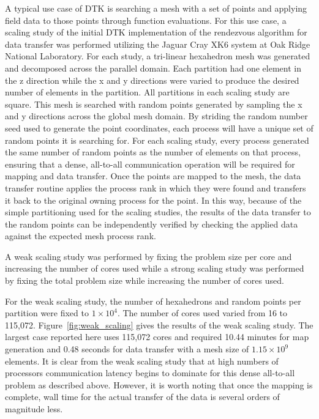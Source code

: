 \documentclass{mc2013}
\begin{document}
\label{sec:examples}

\label{subsec:cht}

\label{subsec:cfd_neutronics}

\label{sec:scaling_study}

A typical use case of DTK is searching a mesh with a set of points and
applying field data to those points through function evaluations. For
this use case, a scaling study of the initial DTK implementation of
the rendezvous algorithm for data transfer was performed utilizing the
Jaguar Cray XK6 system at Oak Ridge National Laboratory. For each
study, a tri-linear hexahedron mesh was generated and decomposed
across the parallel domain. Each partition had one element in the z
direction while the x and y directions were varied to produce the
desired number of elements in the partition. All partitions in each
scaling study are square. This mesh is searched with random points
generated by sampling the x and y directions across the global mesh
domain.  By striding the random number seed used to generate the point
coordinates, each process will have a unique set of random points it
is searching for. For each scaling study, every process generated the
same number of random points as the number of elements on that
process, ensuring that a dense, all-to-all communication operation
will be required for mapping and data transfer. Once the points are
mapped to the mesh, the data transfer routine applies the process rank
in which they were found and transfers it back to the original owning
process for the point. In this way, because of the simple partitioning
used for the scaling studies, the results of the data transfer to the
random points can be independently verified by checking the applied
data against the expected mesh process rank.

A weak scaling study was performed by fixing the problem size per core
and increasing the number of cores used while a strong scaling study
was performed by fixing the total problem size while increasing the
number of cores used.

\label{subsec:weak_scaling}
For the weak scaling study, the number of hexahedrons and random
points per partition were fixed to $1 \times 10^4$. The number of cores
used varied from 16 to 115,072. Figure~\ref{fig:weak_scaling} gives
the results of the weak scaling study. The largest case reported here
uses 115,072 cores and required 10.44 minutes for map generation and
0.48 seconds for data transfer with a mesh size of $1.15 \times 10^9$
elements. It is clear from the weak scaling study that at high numbers
of processors communication latency begins to dominate for this dense
all-to-all problem as described above. However, it is worth noting
that once the mapping is complete, wall time for the actual transfer
of the data is several orders of magnitude less.
\end{document}
